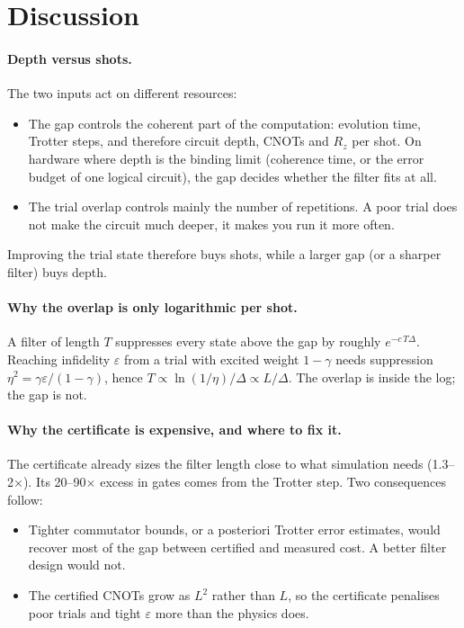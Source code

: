 \documentclass[10pt]{article}
\begin{document}
\section{Discussion}

\paragraph{Depth versus shots.} The two inputs act on different resources:
\begin{itemize}
\item The gap controls the coherent part of the computation: evolution time, Trotter steps, and therefore circuit
depth, CNOTs and $R_z$ per shot. On hardware where depth is the binding limit (coherence time, or the error budget
of one logical circuit), the gap decides whether the filter fits at all.
\item The trial overlap controls mainly the number of repetitions. A poor trial does not make the circuit much
deeper, it makes you run it more often.
\end{itemize}
Improving the trial state therefore buys shots, while a larger gap (or a sharper filter) buys depth.

\paragraph{Why the overlap is only logarithmic per shot.} A filter of length $T$ suppresses every state above the
gap by roughly $e^{-c\,T\Delta}$. Reaching infidelity $\varepsilon$ from a trial with excited weight $1-\gamma$ needs
suppression $\eta^2=\gamma\varepsilon/(1-\gamma)$, hence $T\propto\ln(1/\eta)/\Delta\propto L/\Delta$. The overlap is
inside the log; the gap is not.

\paragraph{Why the certificate is expensive, and where to fix it.} The certificate already sizes the filter
length close to what simulation needs (1.3--2$\times$). Its 20--90$\times$ excess in gates comes from the Trotter
step. Two consequences follow:
\begin{itemize}
\item Tighter commutator bounds, or a posteriori Trotter error estimates, would recover most of the gap between
certified and measured cost. A better filter design would not.
\item The certified CNOTs grow as $L^{2}$ rather than $L$, so the certificate penalises poor trials and tight
$\varepsilon$ more than the physics does.
\end{itemize}
\end{document}
